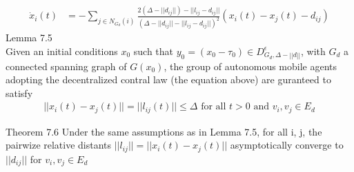 \documentclass{article}
\begin{document}
\begin{problem}
    \begin{align*}
        \dot x_i(t) &= -\sum_{j \in N_{G_d}(i)} \frac{2(\Delta - ||d_{ij}||) - ||l_{ij} - d_{ij}||}{(\Delta - ||d_{ij}|| - ||l_{ij} - d_{ij}||)^2} (x_i(t) - x_j(t) - d_{ij} )
    \end{align*}
    Lemma 7.5\\
    Given an initial conditions $x_0$ such that $y_0 = (x_0 - \tau_0) \in D_{G_{d}, \Delta -||d||}^\epsilon$, with $G_d$ a connected spanning graph of $G(x_0)$, the group of autonomous mobile agents adopting the decentralized contral law (the equation above) are guranteed to satisfy
    \begin{align*}
        ||x_i(t) - x_j(t)|| = ||l_{ij}(t)|| \leq \Delta \text{ for all } t > 0 \text{ and }{ v_i, v_j} \in E_d
    \end{align*}

    Theorem 7.6
    Under the same assumptions as in Lemma 7.5, for all i, j, the pairwize relative distants $||l_{ij}|| = ||x_i(t) - x_j(t)||$ asymptotically converge to $||d_{ij}||$ for ${v_i, v_j} \in E_d$
    

\end{problem}
\end{document}
